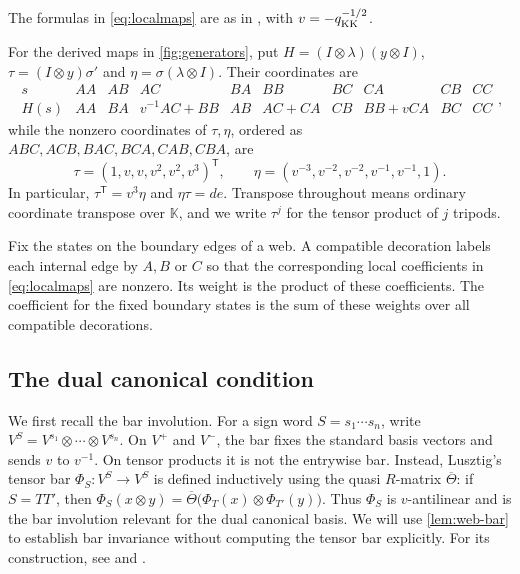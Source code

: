 \documentclass[a4paper,11pt]{amsart}
\newcommand{\F}{\mathbb K}
\newcommand{\tpar}{v}
\numberwithin{equation}{subsection}
\theoremstyle{plain}
\theoremstyle{definition}
\theoremstyle{remark}
\begin{document}
\begin{remark}
The formulas in \autoref{eq:localmaps} are as in
\cite[Section 2]{KK}, with $\tpar=-q_{\rm KK}^{-1/2}$.
\end{remark}

For the derived maps in \autoref{fig:generators}, put
$H=(I\otimes\lambda)(y\otimes I)$,
$\tau=(I\otimes y)\sigma'$ and $\eta=\sigma(\lambda\otimes I)$.
Their coordinates are
\[
\begin{array}{c|ccccccccc}
s&AA&AB&AC&BA&BB&BC&CA&CB&CC\\\hline
H(s)&AA&BA&\tpar^{-1} AC+BB&AB&AC+CA&CB&BB+\tpar CA&BC&CC
\end{array},
\]
while the nonzero coordinates of $\tau,\eta$, ordered as $ABC,ACB,BAC,BCA,CAB,CBA$, are
\begin{equation}\label{eq:tripod}
\tau=(1,\tpar,\tpar,\tpar^2,\tpar^2,\tpar^3)^{\mathsf T},\qquad
\eta=(\tpar^{-3},\tpar^{-2},\tpar^{-2},\tpar^{-1},\tpar^{-1},1).
\end{equation}
In particular,
$\tau^{\mathsf T}=\tpar^3\eta$ and $\eta\tau=de$.
Transpose throughout means ordinary coordinate transpose over $\F$, and we write $\tau^j$ for the tensor
product of $j$ tripods.

\begin{remark}
Fix the states on the boundary edges of a web.
A compatible decoration labels each internal edge by $A,B$ or $C$
so that the corresponding local coefficients in
\autoref{eq:localmaps} are nonzero.
Its weight is the product of these coefficients.
The coefficient for the fixed boundary states is the sum of these
weights over all compatible decorations.
\end{remark}

\subsection{The dual canonical condition}

We first recall the bar involution. For a sign word
$S=s_1\cdots s_n$, write
$V^S=V^{s_1}\otimes\cdots\otimes V^{s_n}$.
On $V^+$ and $V^-$, the bar fixes the standard basis vectors and sends
$\tpar$ to $\tpar^{-1}$. On tensor products it is not the entrywise bar.
Instead, Lusztig's tensor bar
$\Phi_S\colon V^S\longrightarrow V^S$
is defined inductively using the quasi $R$-matrix $\overline\Theta$: if
$S=TT'$, then
$\Phi_S(x\otimes y)
=
\overline\Theta\bigl(\Phi_T(x)\otimes\Phi_{T'}(y)\bigr)$.
Thus $\Phi_S$ is $\tpar$-antilinear and is the bar involution relevant for
the dual canonical basis. We will use \autoref{lem:web-bar} to establish
bar invariance without computing the tensor bar explicitly. For its
construction, see \cite[Chapter 27]{Lusztig} and
\cite[Section 6]{KK}.
\end{document}

